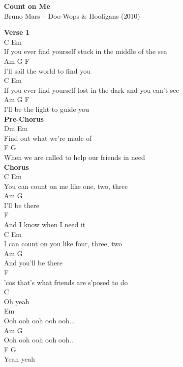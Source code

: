 \documentclass[a4paper]{article}
\begin{document}
    \begin{center}
        \textbf{Count on Me}
        ~\\
        Bruno Mars -- Doo-Wops \& Hooligans (2010)
    \end{center}
    {
        \scriptsize
        \textbf{Verse 1}
        ~\\
        {
            \cutive
            \obeyspaces
       C                                              Em
\\
If you ever find yourself stuck in the middle of the sea
\\
      Am           G     F
\\
I'll sail the world to find you
\\
       C                                                  Em
\\
If you ever find yourself lost in the dark and you can't see
\\
      Am         G     F
\\
I'll be the light to guide you
\\

        }
        \textbf{Pre-Chorus}
        ~\\
        {
            \cutive
            \obeyspaces
Dm                          Em
\\
   Find out what we're made of
\\
     F                                     G
\\
When we are called to help our friends in need
\\

        }
        \textbf{Chorus}
        ~\\
        {
            \cutive
            \obeyspaces
        C                Em
\\
You can count on me like one, two, three
\\
      Am       G
\\
I'll be there
\\
    F
\\
And I know when I need it
\\
      C                 Em
\\
I can count on you like four, three, two
\\
           Am       G
\\
And you'll be there
\\
     F
\\
'cos that's what friends are s'posed to do
\\
   C
\\
Oh yeah
\\
                  Em
\\
Ooh ooh ooh ooh ooh...
\\
                  Am  G
\\
Ooh ooh ooh ooh ooh..
\\
F     G
\\
Yeah yeah
\\

}}
\end{document}
